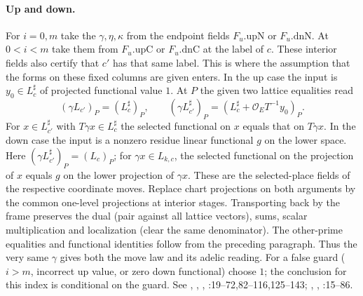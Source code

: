 \paragraph{Up and down.}
For $i=0,m$ take the $\gamma,\eta,\kappa$ from the endpoint fields
$F_u.\mathrm{upN}$ or $F_u.\mathrm{dnN}$. At $0<i<m$ take them from
$F_u.\mathrm{upC}$ or $F_u.\mathrm{dnC}$ at the label of $c$.
These interior fields also certify that $c'$ has that same label. This
is where the assumption that the forms on these fixed columns are given
enters. In the up case the input is $y_0\in L_c^\sharp$ of projected
functional value $1$. At $P$ the given two lattice equalities read
\[
 (\gamma L_{c'})_P=(L_c^\sharp)_P,\qquad
 (\gamma L_{c'}^\sharp)_P=
      (L_c^\sharp+\mathcal O_E T^{-1} y_0)_P .
\]
For $x\in L_{c'}^\sharp$ with $T\gamma x\in L_c^\sharp$ the
selected functional on $x$ equals that on $T\gamma x$. In the down
case the input is a nonzero residue linear functional $g$ on the lower
space. Here $(\gamma L_{c'}^\sharp)_P=(L_c)_P$; for
$\gamma x\in L_{k,c}$, the selected functional on the projection
of $x$ equals $g$ on the lower projection of $\gamma x$. These are
the selected-place fields of the respective coordinate moves. Replace
chart projections on both arguments by the common one-level projections
at interior stages. Transporting back by the frame preserves the dual
(pair against all lattice vectors), sums, scalar multiplication and
localization (clear the same denominator). The other-prime equalities
and functional identities follow from the preceding paragraph. Thus
the very same $\gamma$ gives both the move law and its adelic reading.
For a false guard ($i>m$, incorrect up value, or zero down functional)
choose $1$; the conclusion for this index is conditional on the guard.
See , , ,
:19--72,82--116,125--143;
, ,
:15--86.

